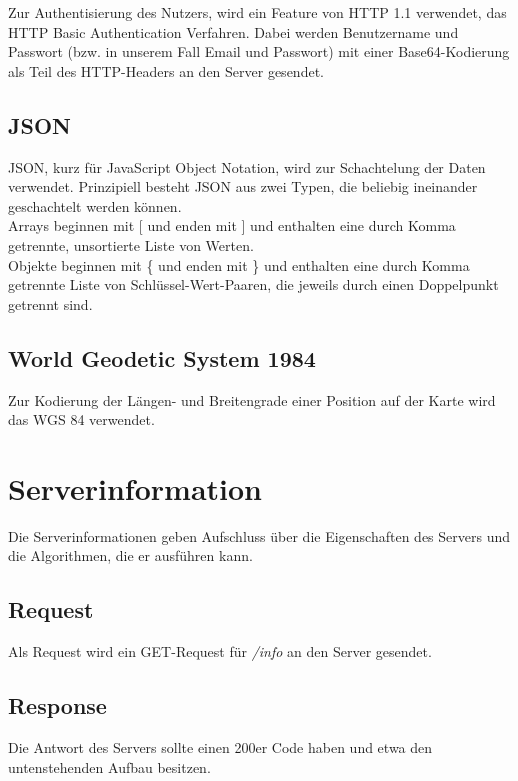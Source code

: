 \documentclass[ngerman]{scrartcl}
\begin{document}
	Zur Authentisierung des Nutzers, wird ein Feature von HTTP 1.1 verwendet, das HTTP Basic Authentication Verfahren.
	Dabei werden Benutzername und Passwort (bzw. in unserem Fall Email und Passwort) mit einer Base64-Kodierung als Teil des HTTP-Headers an den Server gesendet.
	
	\subsection{JSON}
	
	JSON, kurz für JavaScript Object Notation, wird zur Schachtelung der Daten verwendet.
	Prinzipiell besteht JSON aus zwei Typen, die beliebig ineinander geschachtelt werden können. \\
	Arrays beginnen mit [ und enden mit ] und enthalten eine durch Komma getrennte, unsortierte Liste von Werten. \\
	Objekte beginnen mit \{ und enden mit \} und enthalten eine durch Komma getrennte Liste von Schlüssel-Wert-Paaren, die jeweils durch einen Doppelpunkt getrennt sind.
	
	\subsection{World Geodetic System 1984}
	
	Zur Kodierung der Längen- und Breitengrade einer Position auf der Karte wird das WGS 84 verwendet.

\section{Serverinformation}

	Die Serverinformationen geben Aufschluss über die Eigenschaften des Servers und die Algorithmen, die er ausführen kann.

	\subsection*{Request}
	
	Als Request wird ein GET-Request für \textit{/info} an den Server gesendet.
	
	\subsection*{Response}
	
	Die Antwort des Servers sollte einen 200er Code haben und etwa den untenstehenden Aufbau besitzen.
	
\end{document}
